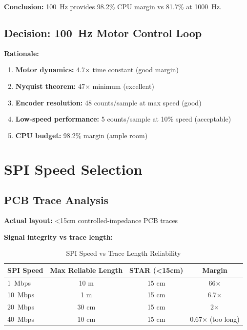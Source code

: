 \textbf{Conclusion:} 100~Hz provides 98.2\% CPU margin vs 81.7\% at 1000~Hz.

\subsection{Decision: 100~Hz Motor Control Loop}

\textbf{Rationale:}
\begin{enumerate}
    \item \textbf{Motor dynamics:} 4.7× time constant (good margin)
    \item \textbf{Nyquist theorem:} 47× minimum (excellent)
    \item \textbf{Encoder resolution:} 48 counts/sample at max speed (good)
    \item \textbf{Low-speed performance:} 5 counts/sample at 10\% speed (acceptable)
    \item \textbf{CPU budget:} 98.2\% margin (ample room)
\end{enumerate}

\section{SPI Speed Selection}

\subsection{PCB Trace Analysis}

\textbf{Actual layout:} <15cm controlled-impedance PCB traces

\textbf{Signal integrity vs trace length:}

\begin{table}[H]
\centering
\caption{SPI Speed vs Trace Length Reliability}
\begin{tabular}{lccc}
\toprule
\textbf{SPI Speed} & \textbf{Max Reliable Length} & \textbf{STAR (<15cm)} & \textbf{Margin} \\
\midrule
1~Mbps & 10 m & 15 cm & 66× \\
10~Mbps & 1 m & 15 cm & 6.7× \\
20~Mbps & 30 cm & 15 cm & 2× \\
40~Mbps & 10 cm & 15 cm & 0.67× (too long) \\
\bottomrule
\end{tabular}
\end{table}

